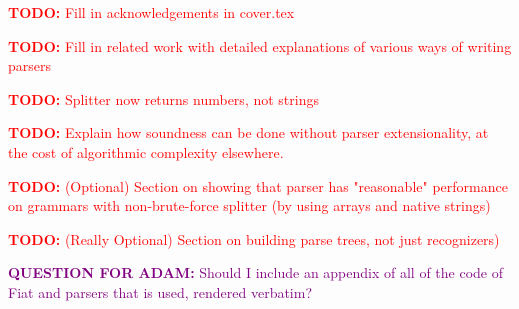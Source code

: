 \newcommand{\todo}[1]{\textcolor{red}{\textbf{TODO:} #1}}
\newcommand{\todoask}[1]{\textcolor{purple}{\textbf{QUESTION FOR ADAM:} #1}}

\todo{Fill in acknowledgements in cover.tex}

\todo{Fill in related work with detailed explanations of various ways of writing parsers}

\todo{Splitter now returns numbers, not strings}

\todo{Explain how soundness can be done without parser extensionality, at the cost of algorithmic complexity elsewhere.}

\todo{(Optional) Section on showing that parser has "reasonable" performance on grammars with non-brute-force splitter (by using arrays and native strings)}

\todo{(Really Optional) Section on building parse trees, not just recognizers)}

\todoask{Should I include an appendix of all of the code of Fiat and parsers that is used, rendered verbatim?}

\cleardoublepage
{}
